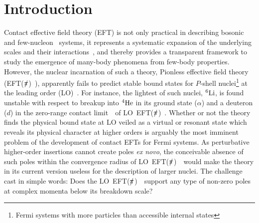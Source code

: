 \documentclass[5p,times]{elsarticle}
\newcommand{\eftnopi}{\mbox{EFT($\slashed{\pi}$) }}
\begin{document}
\maketitle

\section{Introduction}

Contact effective field theory (EFT) is not only practical in describing
bosonic~\cite{Bazak:2016wxm,Carlson:2017txq,Bazak:2018qnu,Bedaque:1998kg,Bedaque:1998km} 
and few-nucleon~\cite{Bedaque:1999ve,Barnea:2013uqa} systems, it represents a systematic
expansion of the underlying scales and their interactions~\cite{Hammer:2019poc,Barnea:2013uqa}, and
thereby provides a transparent framework to study the emergence of many-body phenomena from few-body properties.
However, the nuclear incarnation of such a theory, Pionless effective field theory (\eftnopi), apparently fails to predict
stable bound states for $P$-shell
nuclei\footnote{Fermi systems with more particles than accessible internal states}
at the leading order (LO)~\cite{Stetcu:2006ey,Contessi:2017rww,Dawkins:2019vcr,Schafer:2020ivj}. 
%
For instance, the lightest of such nuclei, $^6 {\rm Li}$, is 
found unstable with respect to breakup into $\rm ^4He$ in its ground state ($\alpha$)
and a deuteron ($d$) in the zero-range contact limit~\cite{Schafer:2020ivj}~of LO~\eftnopi.
Whether or not the theory finds the physical bound state at LO veiled as a virtual or resonant state which
reveals its physical character at higher orders is arguably the most imminent problem of the development of contact EFTs for
Fermi systems.
As perturbative higher-order insertions cannot create poles {\it ex novo}, the conceivable absence of such poles
within the convergence radius of LO~\eftnopi~would make the theory in its current version useless for the description
of larger nuclei.
The challenge cast in simple words: Does the LO~\eftnopi~support any type of non-zero poles at complex momenta below its
breakdown scale?
\end{document}
